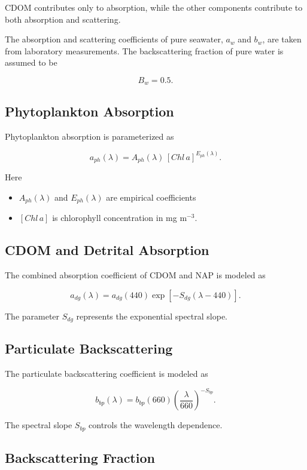 \documentclass[
  letterpaper,
  open=any]{scrbook}
\providecommand{\tightlist}{%
  \setlength{\itemsep}{0pt}\setlength{\parskip}{0pt}}
\begin{document}
CDOM contributes only to absorption, while the other components
contribute to both absorption and scattering.

The absorption and scattering coefficients of pure seawater, \(a_w\) and
\(b_w\), are taken from laboratory measurements. The backscattering
fraction of pure water is assumed to be

\[
B_w = 0.5.
\]

\subsection{Phytoplankton Absorption}\label{phytoplankton-absorption-1}

Phytoplankton absorption is parameterized as

\[
a_{ph}(\lambda) = A_{ph}(\lambda)\,[Chl\,a]^{E_{ph}(\lambda)}.
\]

Here

\begin{itemize}
\tightlist
\item
  \(A_{ph}(\lambda)\) and \(E_{ph}(\lambda)\) are empirical coefficients
\item
  \([Chl\,a]\) is chlorophyll concentration in mg m\(^{-3}\).
\end{itemize}

\subsection{CDOM and Detrital
Absorption}\label{cdom-and-detrital-absorption}

The combined absorption coefficient of CDOM and NAP is modeled as

\[
a_{dg}(\lambda) =
a_{dg}(440)\exp\!\left[-S_{dg}(\lambda-440)\right].
\]

The parameter \(S_{dg}\) represents the exponential spectral slope.

\subsection{Particulate
Backscattering}\label{particulate-backscattering-1}

The particulate backscattering coefficient is modeled as

\[
b_{bp}(\lambda) =
b_{bp}(660)\left(\frac{\lambda}{660}\right)^{-S_{bp}}.
\]

The spectral slope \(S_{bp}\) controls the wavelength dependence.

\subsection{Backscattering Fraction}\label{backscattering-fraction-1}
\end{document}
